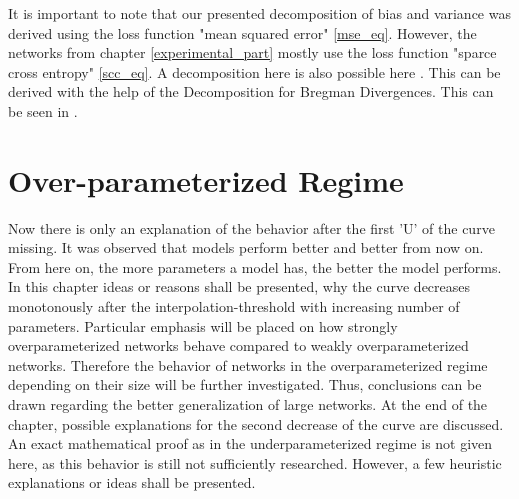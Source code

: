 It is important to note that our presented decomposition of bias and variance was derived using the loss function "mean squared error" \ref{mse_eq}. However, the networks from chapter \ref{experimental_part} mostly use the loss function "sparce cross entropy" \ref{scc_eq}. A decomposition here is also possible here \cite{bias_variance_op}. This can be derived with the help of the Decomposition for Bregman Divergences. This can be seen in \cite{Bergman}.




\newpage

\section{Over-parameterized Regime} %
\label{over-p-regime}
Now there is only an explanation of the behavior after the first 'U' of the curve missing.
It was observed that models perform better and better from now on. From here on, the more parameters a model has, the better the model performs. In this chapter ideas or reasons shall be presented, why the curve decreases monotonously after the interpolation-threshold with increasing number of parameters. Particular emphasis will be placed on how strongly overparameterized networks behave compared to weakly overparameterized networks. Therefore the behavior of networks in the overparameterized regime depending on their size will be further investigated. Thus, conclusions can be drawn regarding the better generalization of large networks. At the end of the chapter, possible explanations for the second decrease of the curve are discussed.\\
An exact mathematical proof as in the underparameterized regime is not given here, as this behavior is still not sufficiently researched. However, a few heuristic explanations or ideas shall be presented.


